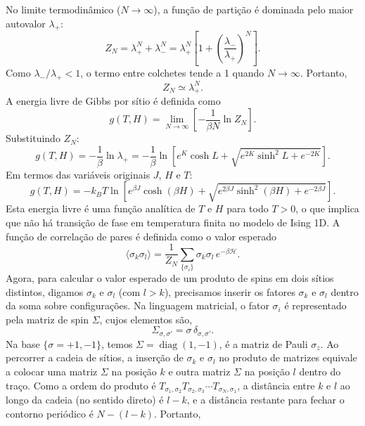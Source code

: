 \documentclass[11pt,a4paper]{article}
\begin{document}
No limite termodinâmico ($N \to \infty$), a função de partição é dominada pelo maior autovalor $\lambda_+$:
%
\begin{equation}
Z_N = \lambda_+^N + \lambda_-^N
= \lambda_+^N \left[ 1 + \left( \frac{\lambda_-}{\lambda_+} \right)^N \right].
\end{equation}
%
Como $\lambda_-/\lambda_+ < 1$, o termo entre colchetes tende a 1 quando $N \to \infty$. Portanto,
%
\begin{equation}
Z_N \simeq \lambda_+^N.
\end{equation}
%
A energia livre de Gibbs por sítio é definida como
%
\begin{equation}
g(T,H) = \lim_{N \to \infty} \left[ -\frac{1}{\beta N} \ln Z_N \right].
\end{equation}
%
Substituindo $Z_N$:
%
\begin{equation}
g(T,H) = -\frac{1}{\beta} \ln \lambda_+
= -\frac{1}{\beta} \ln \left[ e^K \cosh L + \sqrt{ e^{2K}\sinh^2 L + e^{-2K} } \right].
\end{equation}
%
Em termos das variáveis originais $J$, $H$ e $T$:
%
\begin{equation}
g(T,H) = -k_B T \ln \left[ e^{\beta J} \cosh(\beta H) + \sqrt{ e^{2\beta J}\sinh^2(\beta H) + e^{-2\beta J} } \right].
\label{eq:gibbs_free_energy}
\end{equation}
%
Esta energia livre é uma função analítica de $T$ e $H$ para todo $T > 0$, o que implica que não há transição de fase em temperatura finita no modelo de Ising 1D. 
%
A função de correlação de pares é definida como o valor esperado
%
\begin{equation}
\langle \sigma_k \sigma_l \rangle
= \frac{1}{Z_N} \sum_{\{\sigma_i\}} \sigma_k \sigma_l \, e^{-\beta \mathcal H}.
\end{equation}
% 
Agora, para calcular o valor esperado de um produto de spins em dois sítios distintos, digamos \(\sigma_k\) e \(\sigma_l\) (com \(l > k\)), precisamos inserir os fatores \(\sigma_k\) e \(\sigma_l\) dentro da soma sobre configurações. Na linguagem matricial, o fator \(\sigma_i\) é representado pela matriz de spin \(\Sigma\), cujos elementos são,
%
\begin{equation}
\Sigma_{\sigma,\sigma'} = \sigma \, \delta_{\sigma,\sigma'}.
\end{equation}
%
Na base \(\{\sigma = +1, -1\}\), temos \(\Sigma = \operatorname{diag}(1, -1)\), é a matriz de Pauli $\sigma_z$. Ao percorrer a cadeia de sítios, a inserção de \(\sigma_k\) e \(\sigma_l\) no produto de matrizes equivale a colocar uma matriz \(\Sigma\) na posição \(k\) e outra matriz \(\Sigma\) na posição \(l\) dentro do traço. Como a ordem do produto é \(T_{\sigma_1,\sigma_2} T_{\sigma_2,\sigma_3} \cdots T_{\sigma_N,\sigma_1}\), a distância entre \(k\) e \(l\) ao longo da cadeia (no sentido direto) é \(l - k\), e a distância restante para fechar o contorno periódico é \(N - (l - k)\). Portanto,
\end{document}
